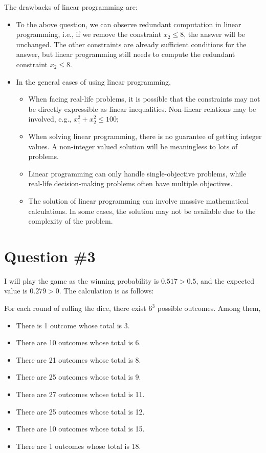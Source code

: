 \documentclass[conference]{styles/acmsiggraph}
\begin{document}
The drawbacks of linear programming are:
\begin{itemize}[leftmargin=*]
	\setlength{\itemsep}{0pt}
	\setlength{\parsep}{0pt}
	\setlength{\parskip}{0pt}
    \item To the above question, we can observe redundant computation in linear programming, i.e., if we remove the constraint $x_2\leq 8$, the answer will be unchanged. The other constraints are already sufficient conditions for the answer, but linear programming still needs to compute the redundant constraint $x_2\leq 8$.
    \item In the general cases of using linear programming, 
    \begin{itemize}[leftmargin=*]
        \item  When facing real-life problems, it is possible that the constraints may not be directly expressible as linear inequalities. Non-linear relations may be involved, e.g., $x_1^2 + x_2^2 \leq 100$;
        \item When solving linear programming, there is no guarantee of getting integer values. A non-integer valued solution will be meaningless to lots of problems.
        \item Linear programming can only handle single-objective problems, while real-life decision-making problems often have multiple objectives.
        \item The solution of linear programming can involve massive mathematical calculations. In some cases, the solution may not be available due to the complexity of the problem.
	\end{itemize}
\end{itemize}

\section{Question \#3}

I will play the game as the winning probability is $0.517 > 0.5$, and the expected value is $0.279 > 0$. The calculation is as follows:

For each round of rolling the dice, there exist $6^3$ possible outcomes. Among them, 
\begin{itemize}[leftmargin=*]
	\setlength{\itemsep}{0pt}
	\setlength{\parsep}{0pt}
	\setlength{\parskip}{0pt}
	\item There is 1 outcome whose total is 3. 
	\item There are 10 outcomes whose total is 6.
	\item There are 21 outcomes whose total is 8.
	\item There are 25 outcomes whose total is 9.
	\item There are 27 outcomes whose total is 11.
	\item There are 25 outcomes whose total is 12.
	\item There are 10 outcomes whose total is 15.
	\item There are 1 outcomes whose total is 18.
\end{itemize}
\end{document}

